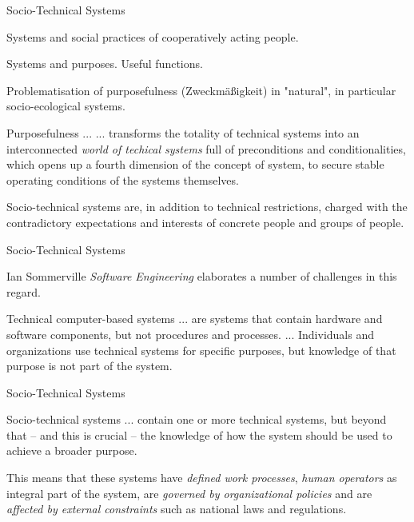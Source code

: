 \documentclass{beamer}
\begin{document}
\begin{frame}{Socio-Technical Systems}

Systems and social practices of cooperatively acting people.

Systems and purposes.  Useful functions.

Problematisation of purposefulness (Zweckmäßigkeit) in "natural", in
particular socio-ecological systems.

\begin{block}{Purposefulness ...}
  ... transforms the totality of technical systems into an interconnected
  \emph{world of techical systems} full of preconditions and conditionalities,
  which opens up a fourth dimension of the concept of system, to secure stable
  operating conditions of the systems themselves.
\end{block}

Socio-technical systems are, in addition to technical restrictions, charged
with the contradictory expectations and interests of concrete people and
groups of people.
\end{frame}

\begin{frame}{Socio-Technical Systems}

  Ian Sommerville \emph{Software Engineering} elaborates a number of
  challenges in this regard.

  \begin{block} {Technical computer-based systems}
    ... are systems that contain hardware and software components, but not
    procedures and processes. ... Individuals and organizations use technical
    systems for specific purposes, but knowledge of that purpose is not part
    of the system.
  \end{block}

\end{frame}

\begin{frame}{Socio-Technical Systems}

  \begin{block}{Socio-technical systems}
    ... contain one or more technical systems, but beyond that -- and this is
    crucial -- the knowledge of how the system should be used to achieve a
    broader purpose.\medskip

    This means that these systems have \emph{defined work processes},
    \emph{human operators} as integral part of the system, are \emph{governed
      by organizational policies} and are \emph{affected by external
      constraints} such as national laws and regulations.
  \end{block}

\end{frame}
\end{document}
